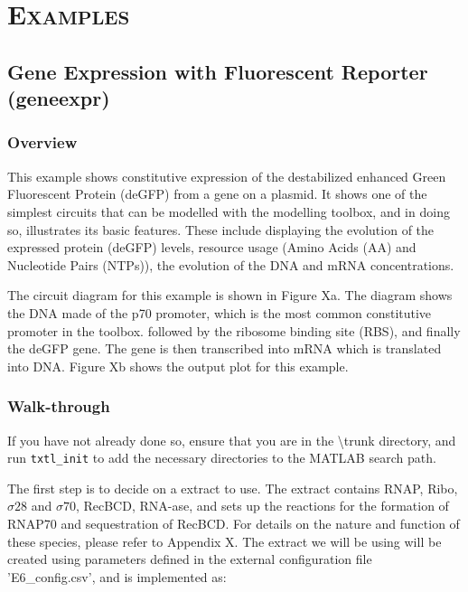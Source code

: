 \documentclass[english]{report}
\begin{document}
\chapter{\textsc{Examples}}
	\section{Gene Expression with Fluorescent Reporter (geneexpr)}
		\subsection{Overview}
		This example shows constitutive expression of the destabilized enhanced Green Fluorescent Protein (deGFP) from a gene on a plasmid. It shows one of the simplest circuits that can be modelled with the modelling toolbox, and in doing so, illustrates its basic features. These include displaying the evolution of the expressed protein (deGFP) levels, resource usage (Amino Acids (AA) and Nucleotide Pairs (NTPs)), the evolution of the DNA and mRNA concentrations. 
		
		The circuit diagram for this example is shown in {\color{red}Figure Xa}. 
		The diagram shows the DNA made of the p70 promoter, which is the most common constitutive promoter in the toolbox. followed by the ribosome binding site (RBS), and finally the deGFP gene. The gene is then transcribed into mRNA which is translated into DNA. 
		{\color{red}Figure Xb} shows the output plot for this example. 
		
		
		
		\subsection{Walk-through}
		If you have not already done so, ensure that you are in the \textsf{\textbackslash trunk} directory, and run \texttt{txtl\_init} to add the necessary directories to the MATLAB search path. 
			
		The first step is to decide on a extract to use. The extract contains RNAP, Ribo, $\sigma 28$ and $\sigma 70$, RecBCD, RNA-ase, and sets up the reactions for the formation of RNAP70 and sequestration of RecBCD. For details on the nature and function of these species, please refer to {\color{red}Appendix X}. The extract we will be using will be created using parameters defined in the external configuration file \textsf{'E6\_config.csv'}, and is implemented as: \\
		
\end{document}
